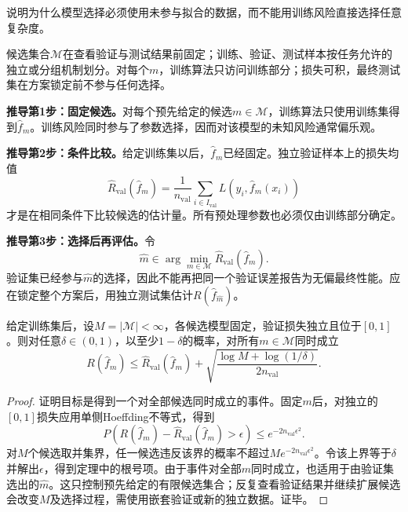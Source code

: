 \label{struct:V3-C07-CH11}

\begin{derivationgoalbox}
说明为什么模型选择必须使用未参与拟合的数据，而不能用训练风险直接选择任意复杂度。
\end{derivationgoalbox}
\begin{derivationprepbox}
候选集合$\mathcal M$在查看验证与测试结果前固定；训练、验证、测试样本按任务允许的独立或分组机制划分。对每个$m$，训练算法只访问训练部分；损失可积，最终测试集在方案锁定前不参与任何选择。
\end{derivationprepbox}

\textbf{推导第1步：固定候选。}对每个预先给定的候选$m\in\mathcal M$，训练算法只使用训练集得到$\widehat f_m$。训练风险同时参与了参数选择，因而对该模型的未知风险通常偏乐观。

\textbf{推导第2步：条件比较。}给定训练集以后，$\widehat f_m$已经固定。独立验证样本上的损失均值
\[
\widehat R_{\mathrm{val}}(\widehat f_m)
=\frac1{n_{\mathrm{val}}}\sum_{i\in I_{\mathrm{val}}}
L(y_i,\widehat f_m(x_i))
\]
才是在相同条件下比较候选的估计量。所有预处理参数也必须仅由训练部分确定。

\textbf{推导第3步：选择后再评估。}令
\[
\widehat m\in\arg\min_{m\in\mathcal M}
\widehat R_{\mathrm{val}}(\widehat f_m).
\]
验证集已经参与$\widehat m$的选择，因此不能再把同一个验证误差报告为无偏最终性能。应在锁定整个方案后，用独立测试集估计$R(\widehat f_{\widehat m})$。

\label{struct:V3-C07-CH12}
\begin{theorem}[有限候选的验证误差控制]\label{thm:V3-C07-validation}
给定训练集后，设$M=|\mathcal M|<\infty$，各候选模型固定，验证损失独立且位于$[0,1]$。则对任意$\delta\in(0,1)$，以至少$1-\delta$的概率，对所有$m\in\mathcal M$同时成立
\[
R(\widehat f_m)\leq
\widehat R_{\mathrm{val}}(\widehat f_m)
+\sqrt{\frac{\log M+\log(1/\delta)}{2n_{\mathrm{val}}}}.
\]
\end{theorem}

\label{struct:V3-C07-CH13}
\begin{proof}
证明目标是得到一个对全部候选同时成立的事件。固定$m$后，对独立的$[0,1]$损失应用单侧Hoeffding不等式，得到
\[
P\!\left(R(\widehat f_m)-\widehat R_{\mathrm{val}}(\widehat f_m)>\epsilon\right)
\leq e^{-2n_{\mathrm{val}}\epsilon^2}.
\]
对$M$个候选取并集界，任一候选违反该界的概率不超过$M e^{-2n_{\mathrm{val}}\epsilon^2}$。令该上界等于$\delta$并解出$\epsilon$，得到定理中的根号项。由于事件对全部$m$同时成立，也适用于由验证集选出的$\widehat m$。这只控制预先给定的有限候选集合；反复查看验证结果并继续扩展候选会改变$M$及选择过程，需使用嵌套验证或新的独立数据。证毕。
\end{proof}


